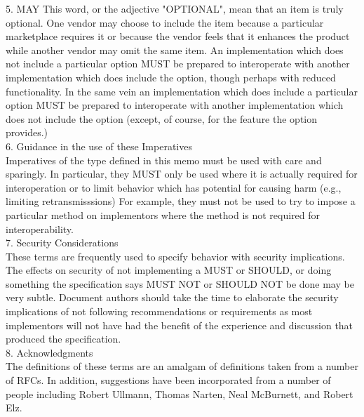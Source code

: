 5. MAY   This word, or the adjective "OPTIONAL", mean that an item is
  truly optional.  One vendor may choose to include the item because a
  particular marketplace requires it or because the vendor feels that
  it enhances the product while another vendor may omit the same item.
  An implementation which does not include a particular option MUST be
  prepared to interoperate with another implementation which does
  include the option, though perhaps with reduced functionality. In the
  same vein an implementation which does include a particular option
  MUST be prepared to interoperate with another implementation which
  does not include the option (except, of course, for the feature the
  option provides.)\\

6. Guidance in the use of these Imperatives\\

  Imperatives of the type defined in this memo must be used with care
  and sparingly.  In particular, they MUST only be used where it is
  actually required for interoperation or to limit behavior which has
  potential for causing harm (e.g., limiting retransmisssions)  For
  example, they must not be used to try to impose a particular method
  on implementors where the method is not required for
  interoperability.\\

7. Security Considerations\\

  These terms are frequently used to specify behavior with security
  implications.  The effects on security of not implementing a MUST or
  SHOULD, or doing something the specification says MUST NOT or SHOULD
  NOT be done may be very subtle. Document authors should take the time
  to elaborate the security implications of not following
  recommendations or requirements as most implementors will not have
  had the benefit of the experience and discussion that produced the
  specification.\\

8. Acknowledgments\\

  The definitions of these terms are an amalgam of definitions taken
  from a number of RFCs.  In addition, suggestions have been
  incorporated from a number of people including Robert Ullmann, Thomas
  Narten, Neal McBurnett, and Robert Elz.\\
